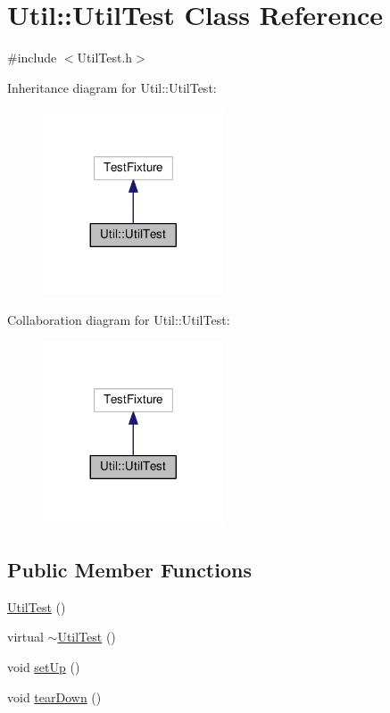 \hypertarget{class_util_1_1_util_test}{}\section{Util\+:\+:Util\+Test Class Reference}
\label{class_util_1_1_util_test}


{\ttfamily \#include $<$Util\+Test.\+h$>$}



Inheritance diagram for Util\+:\+:Util\+Test\+:\nopagebreak
\begin{figure}[H]
\begin{center}
\leavevmode
\includegraphics[width=152pt]{class_util_1_1_util_test__inherit__graph}
\end{center}
\end{figure}


Collaboration diagram for Util\+:\+:Util\+Test\+:\nopagebreak
\begin{figure}[H]
\begin{center}
\leavevmode
\includegraphics[width=152pt]{class_util_1_1_util_test__coll__graph}
\end{center}
\end{figure}
\subsection*{Public Member Functions}
\begin{DoxyCompactItemize}
\item 
\hyperlink{class_util_1_1_util_test_ab49cafae6a575c1026dd374899c93e13}{Util\+Test} ()
\item 
virtual \hyperlink{class_util_1_1_util_test_a9fda2a7b549aeaced49dfa9ac4ccab21}{$\sim$\+Util\+Test} ()
\item 
void \hyperlink{class_util_1_1_util_test_a10968ee4258f61df4caa1dbba822b9e6}{set\+Up} ()
\item 
void \hyperlink{class_util_1_1_util_test_a0b0e3dd728dc81fc516b35ed14f7ab7e}{tear\+Down} ()
\end{DoxyCompactItemize}
